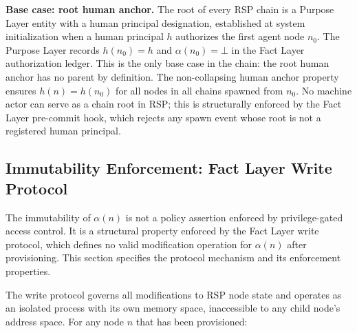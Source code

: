 \begin{note}
\textbf{Base case: root human anchor.} The root of every RSP chain is a Purpose Layer entity with a human principal designation, established at system initialization when a human principal $h$ authorizes the first agent node $n_0$. The Purpose Layer records $h(n_0) = h$ and $\alpha(n_0) = \bot$ in the Fact Layer authorization ledger. This is the only base case in the chain: the root human anchor has no parent by definition. The non-collapsing human anchor property ensures $h(n) = h(n_0)$ for all nodes in all chains spawned from $n_0$. No machine actor can serve as a chain root in RSP; this is structurally enforced by the Fact Layer pre-commit hook, which rejects any spawn event whose root is not a registered human principal.
\end{note}

\subsection{Immutability Enforcement: Fact Layer Write Protocol}
\label{sec:fact-layer-write-protocol}

The immutability of $\alpha(n)$ is not a policy assertion enforced by privilege-gated access control. It is a structural property enforced by the Fact Layer write protocol, which defines no valid modification operation for $\alpha(n)$ after provisioning. This section specifies the protocol mechanism and its enforcement properties.

The write protocol governs all modifications to RSP node state and operates as an isolated process with its own memory space, inaccessible to any child node's address space. For any node $n$ that has been provisioned:


